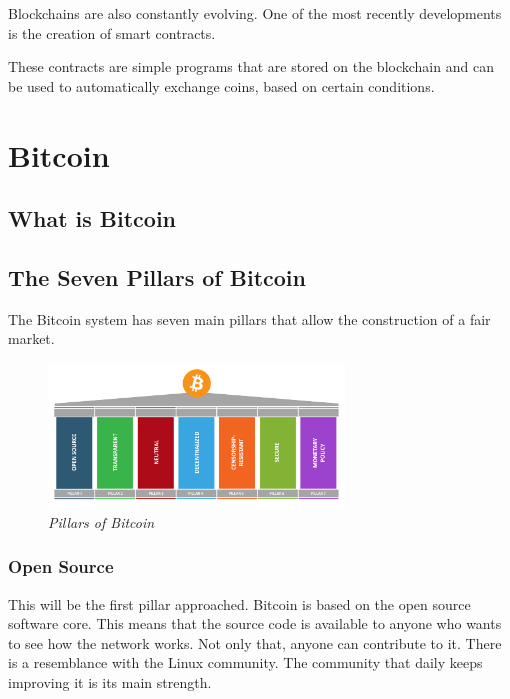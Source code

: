 \documentclass{article}
\newcommand\tab[1][1cm]{\hspace*{#1}}
\begin{document}
\tab Blockchains are also constantly evolving. One of the most recently developments is the creation of smart contracts.

These contracts are simple programs that are stored on the blockchain and can be used to automatically exchange coins, based on certain conditions.

\section{Bitcoin}

\subsection{What is Bitcoin}

\subsection{The Seven Pillars of Bitcoin}

\tab The Bitcoin system has seven main pillars that allow the construction of a fair market. 

\begin{figure}[H]
    \begin{center}
        \includegraphics[width=0.7\textwidth]{images/pillars.png}
        \caption{\textit{Pillars of Bitcoin}}
    \end{center}
\end{figure}

\subsubsection{Open Source}

\tab This will be the first pillar approached. Bitcoin is based on the open source software core. This means that the source code is available to anyone who wants to see how the network works. Not only that, anyone can contribute to it. There is a resemblance with the Linux community. The community that daily keeps improving it is its main strength.
\end{document}
